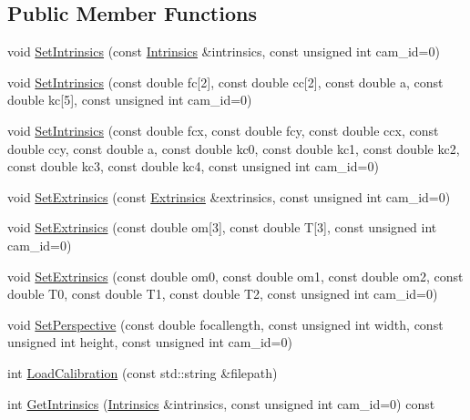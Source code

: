 \subsection*{Public Member Functions}
\begin{DoxyCompactItemize}
\item 
void \hyperlink{classsvl_camera_geometry_afd04c0b03461193e1a8846c2e8849d02}{Set\-Intrinsics} (const \hyperlink{classsvl_camera_geometry_a864f6359614466009baca0666e6bc08e}{Intrinsics} \&intrinsics, const unsigned int cam\-\_\-id=0)
\item 
void \hyperlink{classsvl_camera_geometry_a4994a30449a486e38881b2c38fa39391}{Set\-Intrinsics} (const double fc\mbox{[}2\mbox{]}, const double cc\mbox{[}2\mbox{]}, const double a, const double kc\mbox{[}5\mbox{]}, const unsigned int cam\-\_\-id=0)
\item 
void \hyperlink{classsvl_camera_geometry_a517c798c56ff938f5f246b548101dd36}{Set\-Intrinsics} (const double fcx, const double fcy, const double ccx, const double ccy, const double a, const double kc0, const double kc1, const double kc2, const double kc3, const double kc4, const unsigned int cam\-\_\-id=0)
\item 
void \hyperlink{classsvl_camera_geometry_aba596f7fc002c398cb3320b3bc6ace1e}{Set\-Extrinsics} (const \hyperlink{classsvl_camera_geometry_a6954baa4bd0cc3577af09e13b1c18545}{Extrinsics} \&extrinsics, const unsigned int cam\-\_\-id=0)
\item 
void \hyperlink{classsvl_camera_geometry_a486aef0dc5c9e95e7132cb3b513efe82}{Set\-Extrinsics} (const double om\mbox{[}3\mbox{]}, const double T\mbox{[}3\mbox{]}, const unsigned int cam\-\_\-id=0)
\item 
void \hyperlink{classsvl_camera_geometry_aec32b7236293a114b55bbb82bc4c1c9a}{Set\-Extrinsics} (const double om0, const double om1, const double om2, const double T0, const double T1, const double T2, const unsigned int cam\-\_\-id=0)
\item 
void \hyperlink{classsvl_camera_geometry_af7aba4713343fe5ea6583bc08734b05d}{Set\-Perspective} (const double focallength, const unsigned int width, const unsigned int height, const unsigned int cam\-\_\-id=0)
\item 
int \hyperlink{classsvl_camera_geometry_ac5e3985ffff5a5a056c6a67c09eedf0f}{Load\-Calibration} (const std\-::string \&filepath)
\item 
int \hyperlink{classsvl_camera_geometry_aa1f27e5c312c43e7661a3f4b4f97fadc}{Get\-Intrinsics} (\hyperlink{classsvl_camera_geometry_a864f6359614466009baca0666e6bc08e}{Intrinsics} \&intrinsics, const unsigned int cam\-\_\-id=0) const 

\end{DoxyCompactItemize}
